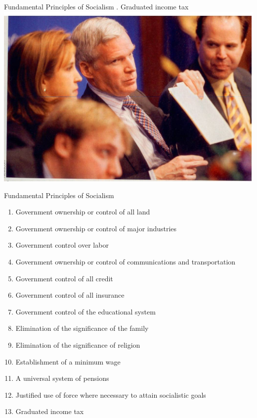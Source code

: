 \begin{frame}[t]{Fundamental Principles of Socialism}
    . Graduated income tax \\
    \includegraphics[width=.9\textwidth]{img/graduated-tax.jpg} \\
\end{frame}

\begin{frame}{Fundamental Principles of Socialism}
    \begin{enumerate}
        \item Government ownership or control of all land
        \item Government ownership or control of major industries
        \item Government control over labor
        \item Government ownership or control of communications and transportation
        \item Government control of all credit
        \item Government control of all insurance
        \item Government control of the educational system
        \item Elimination of the significance of the family
        \item Elimination of the significance of religion
        \item Establishment of a minimum wage
        \item A universal system of pensions
        \item Justified use of force where necessary to attain socialistic goals
        \item Graduated income tax
    \end{enumerate}
\end{frame}

